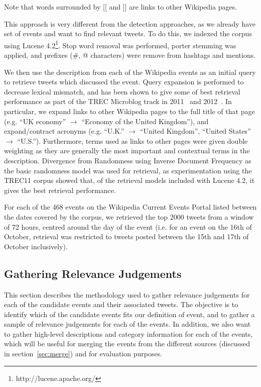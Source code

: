 Note that words surrounded by [[ and ]] are links to other Wikipedia pages.

This approach is very different from the detection approaches, as we already have set of events and want to find relevant tweets.
To do this, we indexed the corpus using Lucene 4.2\footnote{http://lucene.apache.org/}.
Stop word removal was performed, porter stemming was applied, and prefixes (\#, @ characters) were remove from hashtags and mentions.

We then use the description from each of the Wikipedia events as an initial query to retrieve tweets which discussed the event.
Query expansion is performed to decrease lexical mismatch, and has been shown to give some of best retrieval performance as part of the TREC Microblog track in 2011~\citep{gambosi2011fub,ferguson2011clarity,li2011pris} and 2012~\citep{kimovercoming,younosFreq,hanhit}.
In particular, we expand links to other Wikipedia pages to the full title of that page (e.g. ``UK economy'' \(\to\) ``Economy of the United Kingdom''), and expand/contract acronyms (e.g. ``U.K.'' \(\to\) ``United Kingdom'', ``United States'' \(\to\) ``U.S.'').
Furthermore, terms used as links to other pages were given double weighting as they are generally the most important and contextual terms in the description.
Divergence from Randomness using Inverse Document Frequency as the basic randomness model was used for retrieval, as experimentation using the TREC11 corpus showed that, of the retrieval models included with Lucene 4.2, it gives the best retrieval performance.

For each of the 468 events on the Wikipedia Current Events Portal listed between the dates covered by the corpus, we retrieved the top 2000 tweets from a window of 72 hours, centred around the day of the event (i.e. for an event on the 16th of October, retrieval was restricted to tweets posted between the 15th and 17th of October inclusively).


\subsection{Gathering Relevance Judgements}

This section describes the methodology used to gather relevance judgements for each of the candidate events and their associated tweets.
The objective is to identify which of the candidate events fits our definition of event, and to gather a sample of relevance judgements for each of the events.
In addition, we also want to gather high-level descriptions and category information for each of the events, which will be useful for merging the events from the different sources (discussed in section~\ref{sec:merge}) and for evaluation purposes.

